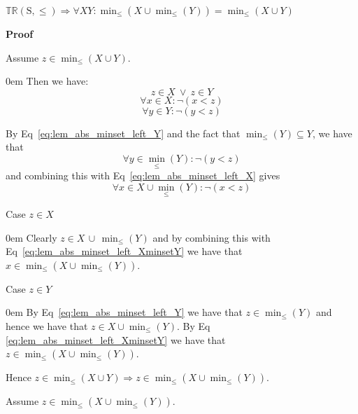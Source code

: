 \documentclass[10pt]{article}
\newcommand{\propname}[1]{{\mathbb{#1}}}
\newcommand{\proof}{\vspace{1em} \textbf{Proof} \vspace{1em}}
\newenvironment{ind}[0]{\begin{addmargin}[1em]{0em}\vspace{0.5em}}{\end{addmargin}\vspace{0.5em}}
\begin{document}
$\propname{TR}(\mathrm{S, \leq}) \Rightarrow \forall X Y : \min_\leq(X \cup \min_\leq(Y)) = \min_\leq(X \cup Y)$

\proof

Assume $z \in \min_\leq(X \cup Y)$. 
\begin{ind}
Then we have:
\begin{equation}
z \in X \ \vee \ z \in Y
\end{equation}
\begin{equation} \label{eq:lem_abs_minset_left_X}
\forall x \in X : \neg (x < z)
\end{equation}
\begin{equation} \label{eq:lem_abs_minset_left_Y}
\forall y \in Y : \neg (y < z)
\end{equation}

By Eq~\ref{eq:lem_abs_minset_left_Y} and the fact that $\min_\leq(Y) \subseteq Y$, we have that
\begin{equation*} 
\forall y \in \min_\leq(Y) : \neg (y < z)
\end{equation*}
and combining this with Eq~\ref{eq:lem_abs_minset_left_X} gives
\begin{equation} \label{eq:lem_abs_minset_left_XminsetY}
\forall x \in X \cup \min_\leq(Y) : \neg (x < z)
\end{equation}

Case $z \in X$
\begin{ind}
Clearly $z \in X \, \cup \, \min_\leq(Y)$ and by combining this with Eq~\ref{eq:lem_abs_minset_left_XminsetY} we have that $x \in \min_\leq(X \cup \min_\leq(Y))$.
\end{ind}

Case $z \in Y$
\begin{ind}
By Eq~\ref{eq:lem_abs_minset_left_Y} we have that $z \in \min_\leq(Y)$ and hence we have that $z \in X \cup \min_\leq(Y)$. By Eq \ref{eq:lem_abs_minset_left_XminsetY} we have that $z \in \min_\leq(X \cup \min_\leq(Y))$.
\end{ind}

Hence $z \in \min_\leq(X \cup Y) \Rightarrow z \in \min_\leq(X \cup \min_\leq(Y))$.
\end{ind}

\vspace{2em}

Assume $z \in \min_\leq(X \cup \min_\leq(Y))$.
\end{document}
